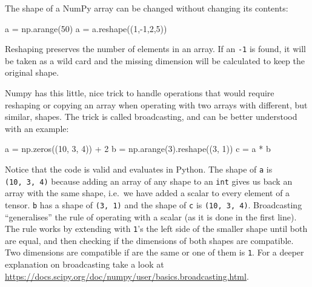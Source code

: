\documentclass[
11pt, %
english, %
singlespacing, %
headsepline, %
]{MastersDoctoralThesis} %
\newenvironment{Shaded}{}{}
\newcommand{\DecValTok}[1]{\textcolor[rgb]{0.25,0.63,0.44}{#1}}
\newcommand{\NormalTok}[1]{#1}
\newcommand{\OperatorTok}[1]{\textcolor[rgb]{0.40,0.40,0.40}{#1}}
\begin{document}
The shape of a NumPy array can be changed without changing its contents:

\begin{Shaded}
\begin{Highlighting}[]
\NormalTok{a }\OperatorTok{=}\NormalTok{ np.arange(}\DecValTok{50}\NormalTok{)}
\NormalTok{a }\OperatorTok{=}\NormalTok{ a.reshape((}\DecValTok{1}\NormalTok{,}\OperatorTok{-}\DecValTok{1}\NormalTok{,}\DecValTok{2}\NormalTok{,}\DecValTok{5}\NormalTok{))}
\end{Highlighting}
\end{Shaded}

Reshaping preserves the number of elements in an array. If an
\texttt{-1} is found, it will be taken as a wild card and the missing
dimension will be calculated to keep the original shape.

Numpy has this little, nice trick to handle operations that would
require reshaping or copying an array when operating with two arrays
with different, but similar, shapes. The trick is called broadcasting,
and can be better understood with an example:

\begin{Shaded}
\begin{Highlighting}[]
\NormalTok{a }\OperatorTok{=}\NormalTok{ np.zeros((}\DecValTok{10}\NormalTok{, }\DecValTok{3}\NormalTok{, }\DecValTok{4}\NormalTok{)) }\OperatorTok{+} \DecValTok{2}
\NormalTok{b }\OperatorTok{=}\NormalTok{ np.arange(}\DecValTok{3}\NormalTok{).reshape((}\DecValTok{3}\NormalTok{, }\DecValTok{1}\NormalTok{))}
\NormalTok{c }\OperatorTok{=}\NormalTok{ a }\OperatorTok{*}\NormalTok{ b}
\end{Highlighting}
\end{Shaded}

Notice that the code is valid and evaluates in Python. The shape of
\texttt{a} is \texttt{(10,\ 3,\ 4)} because adding an array of any shape
to an \texttt{int} gives us back an array with the same shape, i.e.~we
have added a scalar to every element of a tensor. \texttt{b} has a shape
of \texttt{(3,\ 1)} and the shape of \texttt{c} is
\texttt{(10,\ 3,\ 4)}. Broadcasting \enquote{generalises} the rule of
operating with a scalar (as it is done in the first line). The rule
works by extending with \texttt{1}'s the left side of the smaller shape
until both are equal, and then checking if the dimensions of both shapes
are compatible. Two dimensions are compatible if are the same or one of
them is \texttt{1}. For a deeper explanation on broadcasting take a look
at \url{https://docs.scipy.org/doc/numpy/user/basics.broadcasting.html}.
\end{document}

